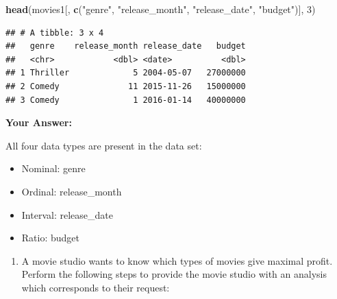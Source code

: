 \documentclass[
]{article}
\newenvironment{Shaded}{\begin{snugshade}}{\end{snugshade}}
\newcommand{\DecValTok}[1]{\textcolor[rgb]{0.00,0.00,0.81}{#1}}
\newcommand{\FunctionTok}[1]{\textcolor[rgb]{0.13,0.29,0.53}{\textbf{#1}}}
\newcommand{\NormalTok}[1]{#1}
\newcommand{\StringTok}[1]{\textcolor[rgb]{0.31,0.60,0.02}{#1}}
\providecommand{\tightlist}{%
  \setlength{\itemsep}{0pt}\setlength{\parskip}{0pt}}
\begin{document}
\begin{Shaded}
\begin{Highlighting}[]
\FunctionTok{head}\NormalTok{(movies1[, }\FunctionTok{c}\NormalTok{(}\StringTok{"genre"}\NormalTok{, }\StringTok{"release\_month"}\NormalTok{, }\StringTok{"release\_date"}\NormalTok{, }\StringTok{"budget"}\NormalTok{)], }\DecValTok{3}\NormalTok{)}
\end{Highlighting}
\end{Shaded}

\begin{verbatim}
## # A tibble: 3 x 4
##   genre    release_month release_date   budget
##   <chr>            <dbl> <date>          <dbl>
## 1 Thriller             5 2004-05-07   27000000
## 2 Comedy              11 2015-11-26   15000000
## 3 Comedy               1 2016-01-14   40000000
\end{verbatim}

\textbf{Your Answer:}

All four data types are present in the data set:

\begin{itemize}
\tightlist
\item
  Nominal: genre
\item
  Ordinal: release\_month
\item
  Interval: release\_date
\item
  Ratio: budget
\end{itemize}

\begin{enumerate}
\def\labelenumi{\arabic{enumi}.}
\setcounter{enumi}{2}
\tightlist
\item
  A movie studio wants to know which types of movies give maximal
  profit. Perform the following steps to provide the movie studio with
  an analysis which corresponds to their request:
\end{enumerate}
\end{document}
